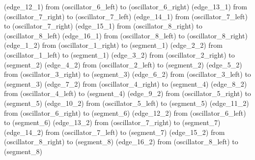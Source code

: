 {\begin{scope}[#1]
		\cdnconnect[cdn offset=1,cdn edge,template coupling/.try,edge edge_12_1/.try] (edge_12_1) from (oscillator_6_left) to (oscillator_6_right)
		\cdnconnect[cdn offset=1,cdn edge,template coupling/.try,edge edge_13_1/.try] (edge_13_1) from (oscillator_7_right) to (oscillator_7_left)
		\cdnconnect[cdn offset=1,cdn edge,template coupling/.try,edge edge_14_1/.try] (edge_14_1) from (oscillator_7_left) to (oscillator_7_right)
		\cdnconnect[cdn offset=1,cdn edge,template coupling/.try,edge edge_15_1/.try] (edge_15_1) from (oscillator_8_right) to (oscillator_8_left)
		\cdnconnect[cdn offset=1,cdn edge,template coupling/.try,edge edge_16_1/.try] (edge_16_1) from (oscillator_8_left) to (oscillator_8_right)
		\cdnconnect[cdn offset=0,cdn edge,edge edge_1_2/.try] (edge_1_2) from (oscillator_1_right) to (segment_1)
		\cdnconnect[cdn offset=0,cdn edge,edge edge_2_2/.try] (edge_2_2) from (oscillator_1_left) to (segment_1)
		\cdnconnect[cdn offset=0,cdn edge,edge edge_3_2/.try] (edge_3_2) from (oscillator_2_right) to (segment_2)
		\cdnconnect[cdn offset=0,cdn edge,edge edge_4_2/.try] (edge_4_2) from (oscillator_2_left) to (segment_2)
		\cdnconnect[cdn offset=0,cdn edge,edge edge_5_2/.try] (edge_5_2) from (oscillator_3_right) to (segment_3)
		\cdnconnect[cdn offset=0,cdn edge,edge edge_6_2/.try] (edge_6_2) from (oscillator_3_left) to (segment_3)
		\cdnconnect[cdn offset=0,cdn edge,edge edge_7_2/.try] (edge_7_2) from (oscillator_4_right) to (segment_4)
		\cdnconnect[cdn offset=0,cdn edge,edge edge_8_2/.try] (edge_8_2) from (oscillator_4_left) to (segment_4)
		\cdnconnect[cdn offset=0,cdn edge,edge edge_9_2/.try] (edge_9_2) from (oscillator_5_right) to (segment_5)
		\cdnconnect[cdn offset=0,cdn edge,edge edge_10_2/.try] (edge_10_2) from (oscillator_5_left) to (segment_5)
		\cdnconnect[cdn offset=0,cdn edge,edge edge_11_2/.try] (edge_11_2) from (oscillator_6_right) to (segment_6)
		\cdnconnect[cdn offset=0,cdn edge,edge edge_12_2/.try] (edge_12_2) from (oscillator_6_left) to (segment_6)
		\cdnconnect[cdn offset=0,cdn edge,edge edge_13_2/.try] (edge_13_2) from (oscillator_7_right) to (segment_7)
		\cdnconnect[cdn offset=0,cdn edge,edge edge_14_2/.try] (edge_14_2) from (oscillator_7_left) to (segment_7)
		\cdnconnect[cdn offset=0,cdn edge,edge edge_15_2/.try] (edge_15_2) from (oscillator_8_right) to (segment_8)
		\cdnconnect[cdn offset=0,cdn edge,edge edge_16_2/.try] (edge_16_2) from (oscillator_8_left) to (segment_8)


\end{scope}}
